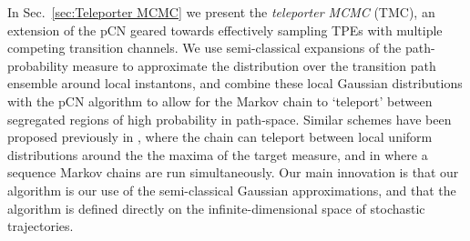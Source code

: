 In Sec.~\ref{sec:Teleporter MCMC} we present the \textit{teleporter MCMC} (TMC), an extension of the pCN geared towards effectively sampling TPEs with multiple competing transition channels. We use semi-classical expansions \citep{chaichianPathIntegralsPhysics2001, schulmanTechniquesApplicationsPath1996, smirnovEstimationPathIntegral2010, moretteDefinitionApproximationFeynman1951, marinovPathIntegralsQuantum1980, sakuraiModernQuantumMechanics2017} of the path-probability measure to approximate the distribution over the transition path ensemble around local instantons, and combine these local Gaussian distributions with the pCN algorithm to allow for the Markov chain to `teleport' between segregated regions of high probability in path-space. Similar schemes have been proposed previously in \citep{sminchisescuModeHoppingMCMCSampler}, where the chain can teleport between local uniform distributions around the the maxima of the target measure, and in \citep{lindseyEnsembleMarkovChain2021} where a sequence Markov chains are run simultaneously. Our main innovation is that our algorithm is our use of the semi-classical Gaussian approximations, and that the algorithm is defined directly on the infinite-dimensional space of stochastic trajectories.


